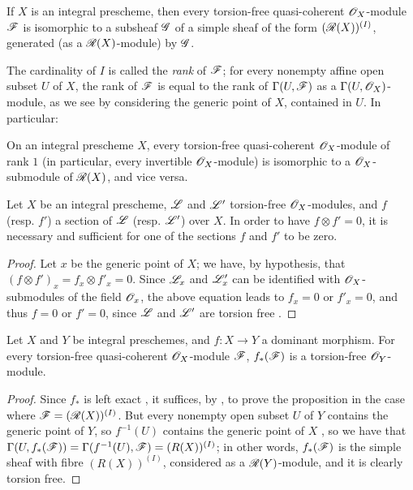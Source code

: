 \begin{proposition}[7.4.2]
\label{I.7.4.2}
If $X$ is an integral prescheme, then every torsion-free quasi-coherent $\mathscr{O}_X$-module $\mathscr{F}$ is isomorphic to a subsheaf $\mathscr{G}$ of a simple sheaf of the form $(\mathscr{R}(X))^{(I)}$, generated (as a $\mathscr{R}(X)$-module) by $\mathscr{G}$.
\end{proposition}

The cardinality of $I$ is called the \emph{rank} of $\mathscr{F}$; for every nonempty affine open subset $U$ of $X$, the rank of $\mathscr{F}$ is equal to the rank of $\Gamma(U,\mathscr{F})$ as a $\Gamma(U,\mathscr{O}_X)$-module, as we see by considering the generic point of $X$, contained in $U$.
In particular:
\begin{corollary}[7.4.3]
\label{I.7.4.3}
On an integral prescheme $X$, every torsion-free quasi-coherent $\mathscr{O}_X$-module of rank $1$ (in particular, every invertible $\mathscr{O}_X$-module) is isomorphic to a $\mathscr{O}_X$-submodule of $\mathscr{R}(X)$, and vice versa.
\end{corollary}

\begin{corollary}[7.4.4]
\label{I.7.4.4}
Let $X$ be an integral prescheme, $\mathscr{L}$ and $\mathscr{L}'$ torsion-free $\mathscr{O}_X$-modules, and $f$ (resp. $f'$) a section of $\mathscr{L}$ (resp. $\mathscr{L}'$) over $X$.
In order to have $f\otimes f'=0$, it is necessary and sufficient for one of the sections $f$ and $f'$ to be zero.
\end{corollary}

\begin{proof}
Let $x$ be the generic point of $X$; we have, by hypothesis, that $(f\otimes f')_x=f_x\otimes f'_x=0$.
Since $\mathscr{L}_x$ and $\mathscr{L}'_x$ can be identified with $\mathscr{O}_X$-submodules of the field $\mathscr{O}_x$, the above equation leads to $f_x=0$ or $f'_x=0$, and thus $f=0$ or $f'=0$, since $\mathscr{L}$ and $\mathscr{L}'$ are torsion free .
\end{proof}

\begin{proposition}[7.4.5]
\label{I.7.4.5}
Let $X$ and $Y$ be integral preschemes, and $f:X\to Y$ a dominant morphism.
For every torsion-free quasi-coherent $\mathscr{O}_X$-module $\mathscr{F}$, $f_*(\mathscr{F})$ is a torsion-free $\mathscr{O}_Y$-module.
\end{proposition}

\begin{proof}
Since
$f_*$ is left exact , it suffices, by , to prove the proposition in the case where $\mathscr{F}=(\mathscr{R}(X))^{(I)}$.
But every nonempty open subset $U$ of $Y$ contains the generic point of $Y$, so $f^{-1}(U)$ contains the generic point of $X$ , so we have that $\Gamma(U,f_*(\mathscr{F}))=\Gamma(f^{-1}(U),\mathscr{F})=(R(X))^{(I)}$; in other words, $f_*(\mathscr{F})$ is the simple sheaf with fibre $(R(X))^{(I)}$, considered as a $\mathscr{R}(Y)$-module, and it is clearly torsion free.
\end{proof}

